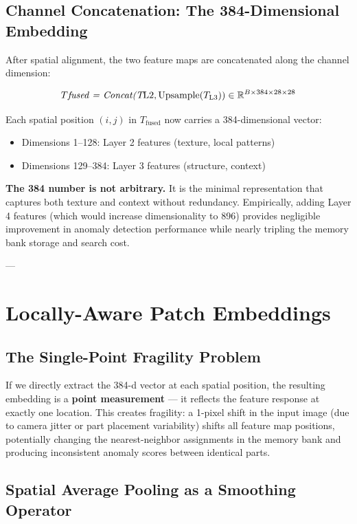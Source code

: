\documentclass[12pt,a4paper,oneside]{report}
\begin{document}
\subsection{Channel Concatenation: The 384-Dimensional Embedding}

After spatial alignment, the two feature maps are concatenated along the channel dimension:

$$T\textit{{\text{fused}} = \text{Concat}(T}{\text{L2}}, \text{Upsample}(T_{\text{L3}})) \in \mathbb{R}^{B \times 384 \times 28 \times 28}$$

Each spatial position $(i, j)$ in $T_{\text{fused}}$ now carries a 384-dimensional vector:
\begin{itemize}
  \item Dimensions 1--128: Layer 2 features (texture, local patterns)
  \item Dimensions 129--384: Layer 3 features (structure, context)
\end{itemize}
\textbf{The 384 number is not arbitrary.} It is the minimal representation that captures both texture and context without redundancy. Empirically, adding Layer 4 features (which would increase dimensionality to 896) provides negligible improvement in anomaly detection performance while nearly tripling the memory bank storage and search cost.

---

\section{Locally-Aware Patch Embeddings}

\subsection{The Single-Point Fragility Problem}

If we directly extract the 384-d vector at each spatial position, the resulting embedding is a \textbf{point measurement} --- it reflects the feature response at exactly one location. This creates fragility: a 1-pixel shift in the input image (due to camera jitter or part placement variability) shifts all feature map positions, potentially changing the nearest-neighbor assignments in the memory bank and producing inconsistent anomaly scores between identical parts.

\subsection{Spatial Average Pooling as a Smoothing Operator}
\end{document}
